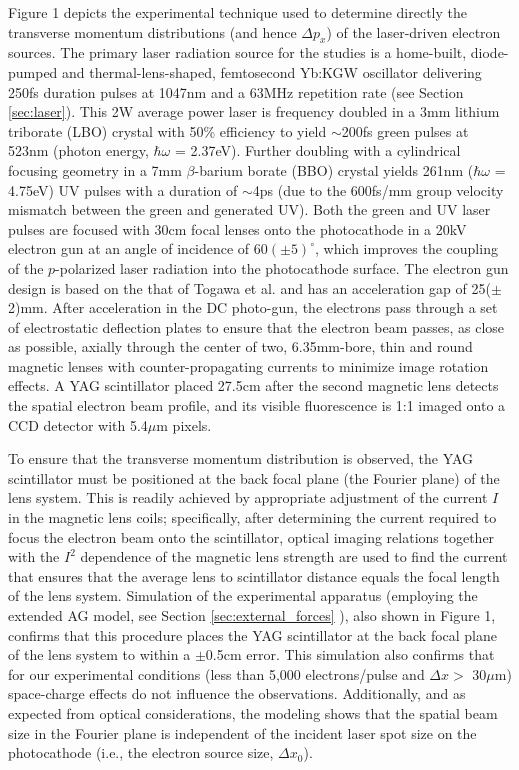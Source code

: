Figure 1 depicts the experimental technique used to determine directly the transverse momentum distributions (and hence $\Delta p_x$) of the laser-driven electron sources.
The primary laser radiation source for the studies is a home-built, diode-pumped and thermal-lens-shaped, femtosecond Yb:KGW oscillator\cite{berger_high-power_2008} delivering 250fs duration pulses at 1047nm and a 63MHz repetition rate (see Section \ref{sec:laser}).
This 2W average power laser is frequency doubled in a 3mm lithium triborate (LBO) crystal with 50\% efficiency to yield $\sim$200fs green pulses at 523nm (photon energy, $\hbar \omega$ = 2.37eV).
Further doubling with a cylindrical focusing geometry in a 7mm $\beta$-barium borate (BBO) crystal yields 261nm ($\hbar \omega$ = 4.75eV) UV pulses with a duration of $\sim$4ps (due to the 600fs/mm group velocity mismatch between the green and generated UV).
Both the green and UV laser pulses are focused with 30cm focal lenses onto the photocathode in a 20kV electron gun at an angle of incidence of $60(\pm5)^{\circ}$, which improves the coupling of the $p$-polarized laser radiation into the photocathode surface\cite{berger_dc_2009}.
The electron gun design is based on the that of Togawa et al.\cite{berger_dc_2009,togawa_ceb6_2007} and has an acceleration gap of 25($\pm$2)mm.
After acceleration in the DC photo-gun, the electrons pass through a set of electrostatic deflection plates to ensure that the electron beam passes, as close as possible, axially through the center of two, 6.35mm-bore, thin and round magnetic lenses with counter-propagating currents to minimize image rotation effects.
A YAG scintillator placed 27.5cm after the second magnetic lens detects the spatial electron beam profile, and its visible fluorescence is 1:1 imaged onto a CCD detector with 5.4$\mu$m pixels. 

To ensure that the transverse momentum distribution is observed, the YAG scintillator must be positioned at the back focal plane (the Fourier plane) of the lens system.
This is readily achieved by appropriate adjustment of the current $I$ in the magnetic lens coils; specifically, after determining the current required to focus the electron beam onto the scintillator, optical imaging relations together with the $I^2$ dependence of the magnetic lens strength are used to find the current that ensures that the average lens to scintillator distance equals the focal length of the lens system.
Simulation of the experimental apparatus (employing the extended AG model, see Section \ref{sec:external_forces} ), also shown in Figure 1, confirms that this procedure places the YAG scintillator at the back focal plane of the lens system to within a $\pm$0.5cm error.
This simulation also confirms that for our experimental conditions (less than 5,000 electrons/pulse and $\Delta x > $ 30$\mu$m) space-charge effects do not influence the observations.
Additionally, and as expected from optical considerations, the modeling shows that the spatial beam size in the Fourier plane is independent of the incident laser spot size on the photocathode (i.e., the electron source size, $\Delta x_0$). 


